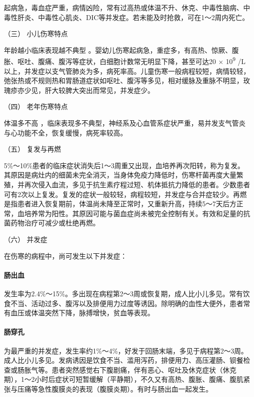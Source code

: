 起病急，毒血症严重，病情凶险，常有过高热或体温不升、休克、中毒性脑病、中毒性肝炎、中毒性心肌炎、DIC等并发症。若未能及时抢救，可在1～2周内死亡。

\hypertarget{text00225.htmlux5cux23CHP7-8-2-1-3}{}
（三） 小儿伤寒特点

年龄越小临床表现越不典型
。婴幼儿伤寒起病急，重症多，有高热、惊厥、腹胀、呕吐、腹痛、腹泻等症状，白细胞计数常无明显下降，甚至可达20
× 10\textsuperscript{9}
/L以上，并发症以支气管肺炎为多，病死率高。儿童伤寒一般病程较短，病情较轻，弛张热或不规则热和胃肠道症状如呕吐、腹泻等多见，相对缓脉及重脉不明显，玫瑰疹亦少见，肝大较脾大突出而常见，并发症少。

\hypertarget{text00225.htmlux5cux23CHP7-8-2-1-4}{}
（四） 老年伤寒特点

体温多不高
，临床表现多不典型，神经系及心血管系症状严重，易并发支气管炎与心功能不全，恢复缓慢，病死率较高。

\hypertarget{text00225.htmlux5cux23CHP7-8-2-1-5}{}
（五） 复发与再燃

5\%～10\%患者的临床症状消失后1～3周重又出现，血培养再次阳转，称为复发。其原因是病灶内的细菌未完全消灭，当身体免疫力降低时，伤寒杆菌再度大量繁殖，并再次侵入血流，多见于抗生素疗程过短、机体抵抗力降低的患者。少数患者可有2次以上复发。复发的症状一般较轻，病程较短，并发症与合并症较少。再燃是指患者进入恢复期前，体温尚未降至正常时，又重新升高，持续5～7天后方正常，血培养常为阳性。其原因可能与菌血症尚未被完全控制有关。有效和足量的抗菌药物治疗可减少或杜绝再燃。

\hypertarget{text00225.htmlux5cux23CHP7-8-2-1-6}{}
（六） 并发症

在伤寒的病程中，尚可发生以下并发症：

\paragraph{肠出血}

发生率为2.4\%～15\%。多出现在病程第2～3周或恢复期，成人比小儿多见。常有饮食不当、活动过多、腹泻以及排便用力过度等诱因。除明确的血性大便外，患者常有血压或体温突然下降，脉搏增快，贫血等表现。

\paragraph{肠穿孔}

为最严重的并发症，发生率约1\%～4\%，好发于回肠末端，多见于病程第2～3周。成人比小儿多见。发病诱因是饮食不当、滥用泻药，排便用力、高压灌肠、钡餐检查或肠胀气等。患者突然感觉右下腹剧痛，伴有恶心、呕吐及休克症状（休克期），1～2小时后症状可短暂缓解（平静期），不久又有高热、腹胀、腹痛、腹肌紧张与压痛等急性腹膜炎的表现（腹膜炎期）。有时与肠出血一起发生。

